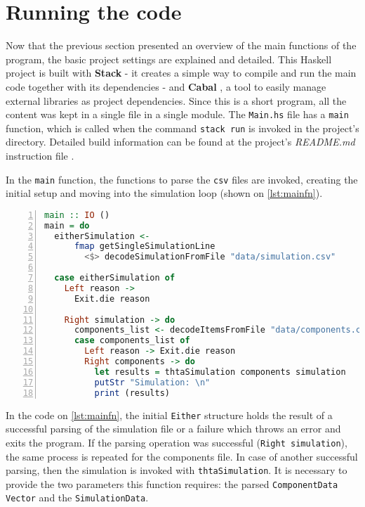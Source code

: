 \section{ Running the code }

Now that the previous section presented an overview of the main functions of the program, the basic project settings are explained and detailed. This Haskell project is built with \textbf{Stack} \cite{stack} - it creates a simple way to compile and run the main code together with its dependencies - and \textbf{Cabal} \cite{cabal}, a tool to easily manage external libraries as project dependencies. Since this is a short program, all the content was kept in a single file in a single module. The \lstinline!Main.hs! file has a \lstinline!main! function, which is called when the command \lstinline!stack run! is invoked in the project's directory. Detailed build information can be found at the project's \textit{README.md} instruction file \cite{thtahs}. 

In the \lstinline!main! function, the functions to parse the \lstinline!csv! files are invoked, creating the initial setup and moving into the simulation loop (shown on \cref{lst:mainfn}).


\begin{lstlisting}[language=Haskell, numbers=left, caption={Main function}, captionpos=b, label={lst:mainfn}]
main :: IO ()
main = do
  eitherSimulation <-
      fmap getSingleSimulationLine
        <$> decodeSimulationFromFile "data/simulation.csv"

  case eitherSimulation of
    Left reason ->
      Exit.die reason

    Right simulation -> do
      components_list <- decodeItemsFromFile "data/components.csv"
      case components_list of
        Left reason -> Exit.die reason
        Right components -> do
          let results = thtaSimulation components simulation
          putStr "Simulation: \n"
          print (results)
\end{lstlisting}


In the code on \cref{lst:mainfn}, the initial \lstinline!Either! structure holds the result of a successful parsing of the simulation file or a failure which throws an error and exits the program. If the parsing operation was successful (\lstinline!Right simulation!), the same process is repeated for the components file. In case of another successful parsing, then the simulation is invoked with \lstinline!thtaSimulation!. It is necessary to provide the two parameters this function requires: the parsed \lstinline!ComponentData! \lstinline!Vector! and the \lstinline!SimulationData!.

